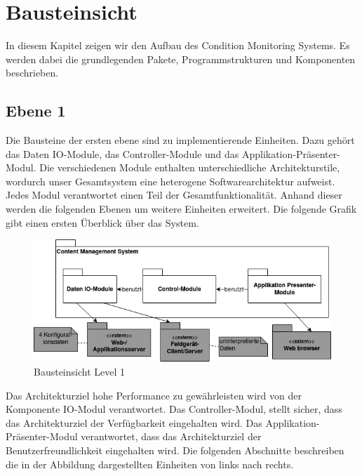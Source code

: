 \chapter{Bausteinsicht}
In diesem Kapitel zeigen wir den Aufbau des Condition Monitoring Systems. Es werden dabei die grundlegenden Pakete, Programmstrukturen und Komponenten beschrieben.
\section{Ebene 1}
Die Bausteine der ersten ebene sind zu implementierende Einheiten. Dazu gehört das Daten IO-Module, das Controller-Module und das Applikation-Präsenter-Modul. 
Die verschiedenen Module enthalten unterschiedliche Architekturstile, wordurch unser Gesamtsystem eine heterogene Softwarearchitektur aufweist. Jedes Modul verantwortet einen Teil der Gesamtfunktionalität. Anhand dieser werden die folgenden Ebenen um weitere Einheiten erweitert. Die folgende Grafik gibt einen ersten Überblick über das System.
\begin{figure}[h]
	\centering
	\includegraphics[width=1.0\textwidth]{Graphics/bausteinansicht_ebene_1.png}
	\caption{Bausteinsicht Level 1}
	\label{fig:bausteinsichtlvl1}
\end{figure}

Das Architekturziel hohe Performance zu gewährleisten wird von der Komponente IO-Modul verantwortet.
Das Controller-Modul, stellt sicher, dass das Architekturziel der Verfügbarkeit eingehalten wird. 
Das Applikation-Präsenter-Modul verantwortet, dass das Architekturziel der Benutzerfreundlichkeit eingehalten wird.
Die folgenden Abschnitte beschreiben die in der Abbildung dargestellten Einheiten von links nach rechts.  
